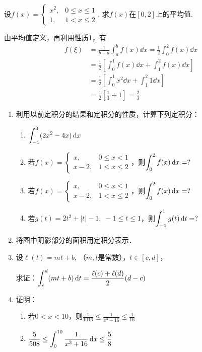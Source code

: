 \begin{example}
  设$f(x)=\begin{cases}
      x^2,& 0\le x\le 1\\
      1,& 1<x\le 2
  \end{cases}$,  求$f(x)$在$[0,2]$上的平均值.
\end{example}

\begin{solution}
由平均值定义，再利用性质1，有    
\[\begin{split}
    f(\xi)&=\frac{1}{b-a}\int^b_a f(x)\dd x=\frac{1}{2}\int^2_0 f(x)\dd x\\
    &=\frac{1}{2}\left[\int^1_0 f(x)\dd x+\int^2_1 f(x)\dd x\right]\\
    &=\frac{1}{2}\left[\int^1_0 x^2\dd x+\int^2_1 1\dd x\right]\\
    &=\frac{1}{2}\left[\frac{1}{3}+1\right]=\frac{2}{3}
\end{split}\]
\end{solution}

\begin{ex}
\begin{enumerate}
    \item 利用以前定积分的结果和定积分的性质，计算下列定积分：
\begin{enumerate}
    \item $\displaystyle\int^3_{-1}(2x^2-4x)\,{\rm d} x$
    \item 若$f(x)=\begin{cases}
        x,& 0\le x<1\\
        x-2,& 1\le x\le 2
    \end{cases}$，则$\displaystyle\int^2_0 f(x)\,{\rm d} x=?$
    \item 若$f(x)=\begin{cases}
        x,& 0\le x\le 1\\
        x-2,& 1< x\le 2
    \end{cases}$，则$\displaystyle\int^2_0 f(x)\,{\rm d} x=?$
\item 若$g(t)=2t^2+|t|-1,\; -1\le t\le 1$，则$\displaystyle\int^1_{-1} g(t)\,{\rm d} t=?$
\end{enumerate}

\item 将图中阴影部分的面积用定积分表示．
\item 设$\ell(t)=mt+b$, （$m,t$是常数），$t\in [c,d]$，

求证：$\displaystyle\int^d_c (mt+b)\,{\rm d} t=\dfrac{\ell(c)+\ell(d)}{2}(d-c)$
\item 证明：
\begin{enumerate}
    \item 若$0<x<10$，则$\frac{1}{1016}\le\frac{1}{x^3+16}\le \frac{1}{16}$
    \item $\dfrac{5}{508}\le \displaystyle\int^{10}_0\dfrac{1}{x^3+16}\,{\rm d} x\le \dfrac{5}{8}$
\end{enumerate}
\end{enumerate}
\end{ex}

